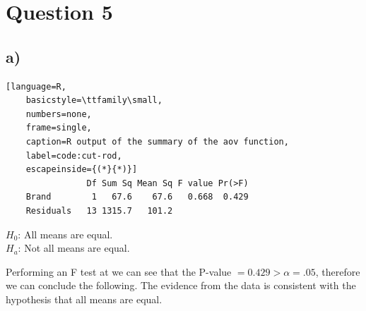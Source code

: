 \documentclass{article}
\begin{document}
\clearpage
\section*{Question 5}
\subsection*{a)}
\begin{lstlisting}[language=R, 
    basicstyle=\ttfamily\small,
    numbers=none, 
    frame=single, 
    caption=R output of the summary of the aov function,
    label=code:cut-rod,
    escapeinside={(*}{*)}]
                Df Sum Sq Mean Sq F value Pr(>F)
    Brand        1   67.6    67.6   0.668  0.429
    Residuals   13 1315.7   101.2 
\end{lstlisting}
\begin{flushleft}
$H_0$: All means are equal. \\
$H_a$: Not all means are equal. \\
\end{flushleft}
Performing an F test at we can see that the P-value $ = 0.429 > \alpha = .05$, therefore we can conclude the following.
The evidence from the data is consistent with the hypothesis that all means are equal.
\end{document}
